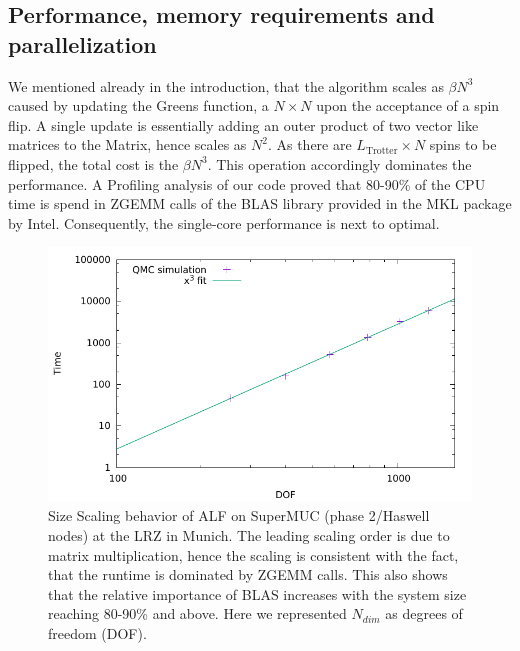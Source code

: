
\subsection{Performance, memory requirements and parallelization}


We mentioned already in the introduction, that the algorithm scales as $\beta N^3$ caused by updating the Greens function, a $N\times N$ upon the acceptance of a spin flip. A single update is essentially adding an outer product of two vector like matrices to the Matrix, hence scales as $N^2$. As there are $L_{\text{Trotter}}\times N$ spins to be flipped, the total cost is the $\beta N^3$. This operation accordingly dominates the performance. A Profiling analysis of our code proved that 80-90\% of the CPU time is spend in ZGEMM calls of the BLAS library provided in the MKL package by Intel. Consequently, the single-core performance is next to optimal.

\begin{figure}[h]
	\begin{center}
		\includegraphics[scale=.8]{Figures/Size_scaling_ALF.pdf}
	\end{center}
	\caption{\label{fig_scaling_size}Size Scaling behavior of ALF on SuperMUC (phase 2/Haswell nodes) at the LRZ in Munich. The leading scaling order is due to matrix multiplication, hence the scaling is consistent with the fact, that the runtime is dominated by ZGEMM calls. This also shows that the relative importance of BLAS increases with the system size reaching 80-90\% and above. Here we represented $N_{dim}$ as degrees of freedom (DOF).}
\end{figure}

